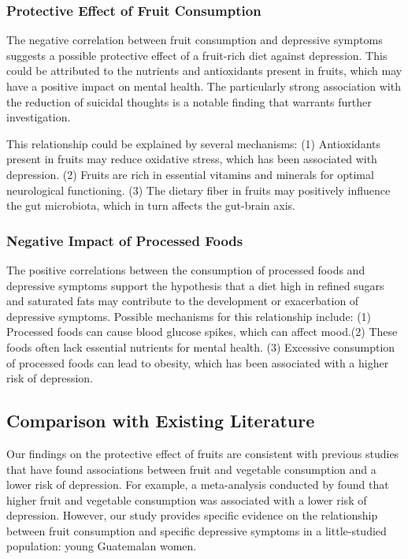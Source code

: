 \documentclass[jou]{apa7}
\begin{document}
\subsubsection{Protective Effect of Fruit Consumption}

The negative correlation between fruit consumption and depressive symptoms suggests a possible protective effect of a fruit-rich diet against depression. This could be attributed to the nutrients and antioxidants present in fruits, which may have a positive impact on mental health. The particularly strong association with the reduction of suicidal thoughts is a notable finding that warrants further investigation.

This relationship could be explained by several mechanisms: (1) Antioxidants present in fruits may reduce oxidative stress, which has been associated with depression. (2) Fruits are rich in essential vitamins and minerals for optimal neurological functioning. (3) The dietary fiber in fruits may positively influence the gut microbiota, which in turn affects the gut-brain axis.

\subsubsection{Negative Impact of Processed Foods}\label{impacto-negativo-de-alimentos-procesados}

The positive correlations between the consumption of processed foods and depressive symptoms support the hypothesis that a diet high in refined sugars and saturated fats may contribute to the development or exacerbation of depressive symptoms. Possible mechanisms for this relationship include: (1) Processed foods can cause blood glucose spikes, which can affect mood.(2) These foods often lack essential nutrients for mental health. (3) Excessive consumption of processed foods can lead to obesity, which has been associated with a higher risk of depression.


\subsection{Comparison with Existing Literature}\label{comparison-with-existing-literature}

Our findings on the protective effect of fruits are consistent with previous studies that have found associations between fruit and vegetable consumption and a lower risk of depression. For example, a meta-analysis conducted by \parencite{liuFruitVegetableConsumption2016} found that higher fruit and vegetable consumption was associated with a lower risk of depression. However, our study provides specific evidence on the relationship between fruit consumption and specific depressive symptoms in a little-studied population: young Guatemalan women.
\end{document}
